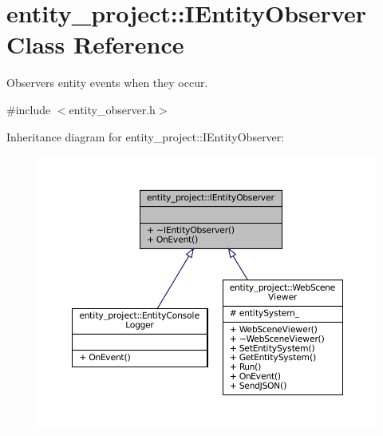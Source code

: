 \hypertarget{classentity__project_1_1IEntityObserver}{}\section{entity\+\_\+project\+:\+:I\+Entity\+Observer Class Reference}
\label{classentity__project_1_1IEntityObserver}


Observers entity events when they occur.  




{\ttfamily \#include $<$entity\+\_\+observer.\+h$>$}



Inheritance diagram for entity\+\_\+project\+:\+:I\+Entity\+Observer\+:
\nopagebreak
\begin{figure}[H]
\begin{center}
\leavevmode
\includegraphics[width=350pt]{classentity__project_1_1IEntityObserver__inherit__graph}
\end{center}
\end{figure}
